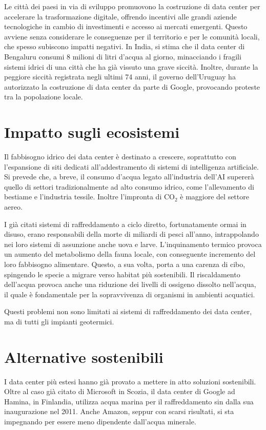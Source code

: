 \documentclass[12pt,a4paper,oneside]{book}
\begin{document}
Le città dei paesi in via di sviluppo promuovono la costruzione di data center per accelerare la trasformazione digitale, offrendo incentivi alle grandi aziende tecnologiche in cambio di investimenti e accesso ai mercati emergenti. Questo avviene senza considerare le conseguenze per il territorio e per le comunità locali, che spesso subiscono impatti negativi.
In India, si stima che il data center di Bengaluru consumi 8 milioni di litri d'acqua al giorno, minacciando i fragili sistemi idrici di una città che ha già vissuto una grave siccità.
Inoltre, durante la peggiore siccità registrata negli ultimi 74 anni, il governo dell'Uruguay ha autorizzato la costruzione di data center da parte di Google, provocando proteste tra la popolazione locale.

\section{Impatto sugli ecosistemi}
Il fabbisogno idrico dei data center è destinato a crescere, soprattutto con l'espansione di siti dedicati all'addestramento di sistemi di intelligenza artificiale. Si prevede che, a breve, il consumo d'acqua legato all'industria dell'AI supererà quello di settori tradizionalmente ad alto consumo idrico, come l'allevamento di bestiame e l'industria tessile. Inoltre l'impronta di CO$_2$ è maggiore del settore aereo.

I già citati sistemi di raffreddamento a ciclo diretto, fortunatamente ormai in disuso, erano responsabili della morte di miliardi di pesci all'anno, intrappolando nei loro sistemi di assunzione anche uova e larve. L'inquinamento termico provoca un aumento del metabolismo della fauna locale, con conseguente incremento del loro fabbisogno alimentare. Questo, a sua volta, porta a una carenza di cibo, spingendo le specie a migrare verso habitat più sostenibili. Il riscaldamento dell'acqua provoca anche una riduzione dei livelli di ossigeno dissolto nell'acqua, il quale è fondamentale per la sopravvivenza di organismi in ambienti acquatici.

Questi problemi non sono limitati ai sistemi di raffreddamento dei data center, ma di tutti gli impianti geotermici.

\section{Alternative sostenibili}

I data center più estesi hanno già provato a mettere in atto soluzioni sostenibili. Oltre al caso già citato di Microsoft in Scozia, il data center di Google ad Hamina, in Finlandia, utilizza acqua marina per il raffreddamento sin dalla sua inaugurazione nel 2011. Anche Amazon, seppur con scarsi risultati, si sta impegnando per essere meno dipendente dall'acqua minerale.
\end{document}
